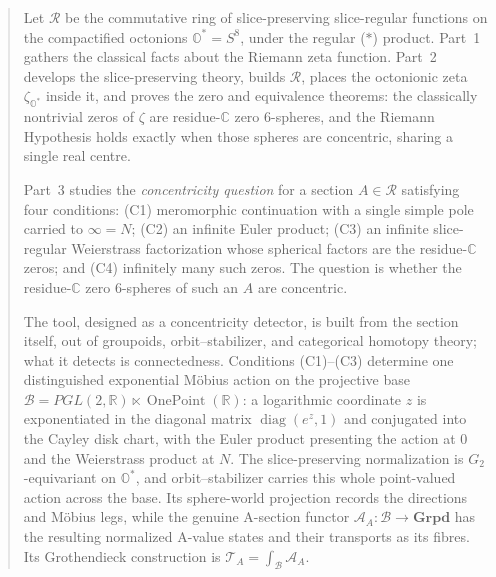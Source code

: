 \documentclass[11pt]{article}
\newcommand{\OO}{\mathbb{O}}
\newcommand{\CC}{\mathbb{C}}
\newcommand{\RR}{\mathbb{R}}
\newcommand{\Ostar}{\OO^{*}}
\newcommand{\zetaO}{\zeta_{\Ostar}}
\theoremstyle{plain}
\theoremstyle{definition}
\theoremstyle{remark}
\begin{document}
\begin{abstract}
Let $\mathcal R$ be the commutative ring of slice-preserving slice-regular functions on the
compactified octonions $\OO^{*}=S^8$, under the regular ($\ast$) product. Part~1 gathers the
classical facts about the Riemann zeta function. Part~2 develops the slice-preserving theory,
builds $\mathcal R$, places the octonionic zeta $\zetaO$ inside it, and proves the zero and
equivalence theorems: the classically nontrivial zeros of $\zeta$ are residue-$\CC$ zero
$6$-spheres, and the Riemann Hypothesis holds exactly when those spheres are concentric, sharing
a single real centre.

Part~3 studies the \emph{concentricity question} for a section $A\in\mathcal R$
satisfying four conditions: \textup{(C1)} meromorphic continuation with a single simple pole
carried to $\infty=N$; \textup{(C2)} an infinite Euler product; \textup{(C3)} an infinite
slice-regular Weierstrass factorization whose spherical factors are the residue-$\CC$ zeros; and
\textup{(C4)} infinitely many such zeros. The question is whether the residue-$\CC$ zero
$6$-spheres of such an $A$ are concentric.

The tool, designed as a concentricity detector, is built from the section itself, out of
groupoids, orbit--stabilizer, and categorical homotopy theory; what it detects is connectedness. Conditions \textup{(C1)--(C3)} determine one
distinguished exponential M\"obius action on the projective base
$\mathcal B=PGL(2,\RR)\ltimes\operatorname{OnePoint}(\RR)$: a logarithmic coordinate $z$ is
exponentiated in the diagonal matrix $\operatorname{diag}(e^z,1)$ and conjugated into the Cayley
disk chart, with the Euler product presenting the action at $0$ and the Weierstrass product at
$N$. The slice-preserving normalization is $G_2$-equivariant on $\Ostar$, and
orbit--stabilizer carries this whole point-valued action across the base. Its sphere-world
projection records the directions and M\"obius legs, while the genuine A-section functor
$\mathcal A_A:\mathcal B\to\mathbf{Grpd}$ has the resulting normalized A-value states and their
transports as its fibres. Its Grothendieck construction is
$\mathcal T_A=\int_{\mathcal B}\mathcal A_A$.


\end{abstract}
\end{document}
